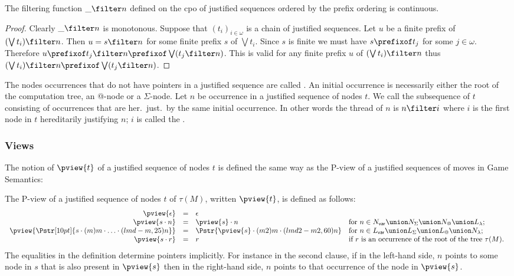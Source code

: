 \begin{lemma}
\label{lem:filtercontinous}
The filtering function $\_ \filter n$ defined on the cpo of justified sequences ordered by the prefix ordering is continuous.
\end{lemma}
\begin{proof}
Clearly $\_ \filter n$ is monotonous.
Suppose that $(t_i)_{i\in\omega}$ is a chain of justified sequences. Let $u$ be a finite prefix of $(\bigvee t_i) \filter n$.
Then $u = s \filter n$ for some finite prefix $s$ of $\bigvee t_i$. Since $s$ is finite we must have $s \prefixof t_j$ for some $j\in\omega$.
Therefore $u \prefixof t_j \filter n \prefixof \bigvee (t_j \filter  n)$.
This is valid for any finite prefix $u$ of $(\bigvee t_i) \filter n$ thus $(\bigvee t_i) \filter  n \prefixof \bigvee (t_j \filter n)$.
\end{proof}


The nodes occurrences that do not have pointers in a justified
sequence are called . An initial
occurrence is necessarily either the root of the computation tree,
an @-node or a $\Sigma$-node. Let $n$ be occurrence in a justified
sequence of nodes $t$. We call
 the subsequence of $t$
consisting of occurrences that are her.\ just.\ by the same initial
occurrence. In other words the thread of $n$ is $n \filter i$ where
$i$ is the first node in $t$ hereditarily justifying $n$; $i$ is
called the .

\subsubsection{Views}
The notion of  $\pview{t}$ of a justified sequence
of nodes $t$ is defined the same way as the P-view of a justified
sequences of moves in Game Semantics:

\begin{definition}
The P-view of a justified sequence of nodes $t$ of $\tau(M)$, written $\pview{t}$, is defined as follows:
$$\begin{array}{rcll}
 \pview{\epsilon} &=&  \epsilon \\
 \pview{s \cdot n }  &=&  \pview{s} \cdot n
    & \mbox{for $n \in N_{\sf var} \union N_\Sigma \union N_@ \union L_\lambda$;}
    \\
 \pview{\Pstr[10pt]{ s \cdot (m){m} \cdot \ldots \cdot (lmd-m,25){n}}} &=&
        \Pstr{ \pview{s} \cdot (m2){m} \cdot (lmd2-m2,60){n} }
    & \mbox{for $n \in L_{\sf var} \union L_\Sigma \union L_@ \union N_\lambda$;}
    \\
 \pview{s \cdot r }  &=&  r
    & \mbox{if $r$ is an occurrence of the root of the tree $\tau(M)$. }
\end{array}$$
The equalities in the definition determine pointers implicitly. For
instance in the second clause, if in the left-hand side, $n$ points
to some node in $s$  that is also present in $\pview{s}$ then in the
right-hand side, $n$ points to that occurrence of the node in
$\pview{s}$.
\end{definition}

